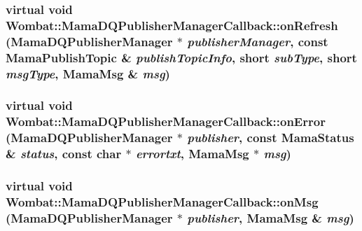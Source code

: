 \label{classWombat_1_1MamaDQPublisherManagerCallback_a965ba3cb09c848ec2e9b389758ede731}
\hypertarget{classWombat_1_1MamaDQPublisherManagerCallback_a4083f41af3fcab7842b12ea6aeb817c6}{
\subsubsection[{onRefresh}]{\setlength{\rightskip}{0pt plus 5cm}virtual void Wombat::MamaDQPublisherManagerCallback::onRefresh ({\bf MamaDQPublisherManager} $\ast$ {\em publisherManager}, \/  const {\bf MamaPublishTopic} \& {\em publishTopicInfo}, \/  short {\em subType}, \/  short {\em msgType}, \/  {\bf MamaMsg} \& {\em msg})}}
\label{classWombat_1_1MamaDQPublisherManagerCallback_a4083f41af3fcab7842b12ea6aeb817c6}
\hypertarget{classWombat_1_1MamaDQPublisherManagerCallback_aa3df0616a84eb7cf0f5dff24946beb14}{
\subsubsection[{onError}]{\setlength{\rightskip}{0pt plus 5cm}virtual void Wombat::MamaDQPublisherManagerCallback::onError ({\bf MamaDQPublisherManager} $\ast$ {\em publisher}, \/  const {\bf MamaStatus} \& {\em status}, \/  const char $\ast$ {\em errortxt}, \/  {\bf MamaMsg} $\ast$ {\em msg})}}
\label{classWombat_1_1MamaDQPublisherManagerCallback_aa3df0616a84eb7cf0f5dff24946beb14}
\hypertarget{classWombat_1_1MamaDQPublisherManagerCallback_a66c9b8bdfac8ca21fa46f64f928d7da8}{
\subsubsection[{onMsg}]{\setlength{\rightskip}{0pt plus 5cm}virtual void Wombat::MamaDQPublisherManagerCallback::onMsg ({\bf MamaDQPublisherManager} $\ast$ {\em publisher}, \/  {\bf MamaMsg} \& {\em msg})}}
\label{classWombat_1_1MamaDQPublisherManagerCallback_a66c9b8bdfac8ca21fa46f64f928d7da8}
